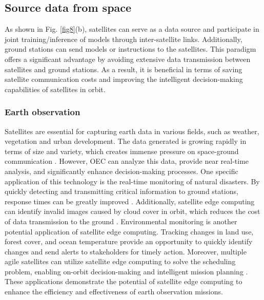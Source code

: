 \documentclass[lettersize,journal]{IEEEtran}
\begin{document}
\subsection{Source data from space}
As shown in Fig. \ref{fig8}(b), satellites can serve as a data source and participate in joint training/inference of models through inter-satellite links. Additionally, ground stations can send models or instructions to the satellites. This paradigm offers a significant advantage by avoiding extensive data transmission between satellites and ground stations. As a result, it is beneficial in terms of saving satellite communication costs and improving the intelligent decision-making capabilities of satellites in orbit.

\subsubsection*{Earth observation} 
Satellites are essential for capturing earth data in various fields, such as weather, vegetation and urban development. The data generated is growing rapidly in terms of size and variety, which creates immense pressure on space-ground communication \cite{RN237}. However, OEC can analyze this data, provide near real-time analysis, and significantly enhance decision-making processes. One specific application of this technology is the real-time monitoring of natural disasters. By quickly detecting and transmitting critical information to ground stations, response times can be greatly improved \cite{RN187}. Additionally, satellite edge computing can identify invalid images caused by cloud cover in orbit, which reduces the cost of data transmission to the ground \cite{RN13}. Environmental monitoring is another potential application of satellite edge computing. Tracking changes in land use, forest cover, and ocean temperature provide an opportunity to quickly identify changes and send alerts to stakeholders for timely action. Moreover, multiple agile satellites can utilize satellite edge computing to solve the scheduling problem, enabling on-orbit decision-making and intelligent mission planning \cite{RN236}. These applications demonstrate the potential of satellite edge computing to enhance the efficiency and effectiveness of earth observation missions.
\end{document}
